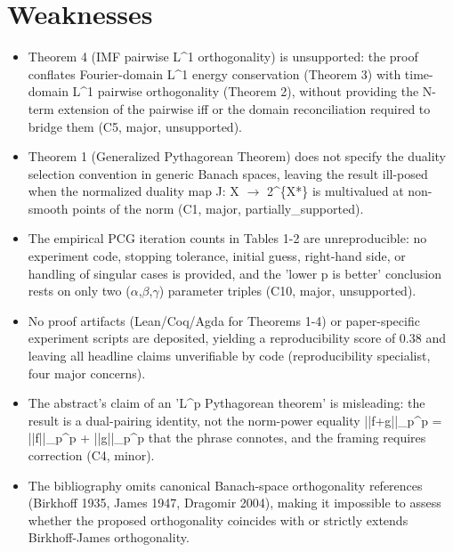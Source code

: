 \documentclass[11pt]{article}
\begin{document}
\section*{Weaknesses}
\begin{itemize}[leftmargin=*]
  \item Theorem 4 (IMF pairwise L\^{}1 orthogonality) is unsupported: the proof conflates Fourier-domain L\^{}1 energy conservation (Theorem 3) with time-domain L\^{}1 pairwise orthogonality (Theorem 2), without providing the N-term extension of the pairwise iff or the domain reconciliation required to bridge them (C5, major, unsupported).
  \item Theorem 1 (Generalized Pythagorean Theorem) does not specify the duality selection convention in generic Banach spaces, leaving the result ill-posed when the normalized duality map J: X \ensuremath{\to} 2\^{}\{X*\} is multivalued at non-smooth points of the norm (C1, major, partially\_supported).
  \item The empirical PCG iteration counts in Tables 1-2 are unreproducible: no experiment code, stopping tolerance, initial guess, right-hand side, or handling of singular cases is provided, and the 'lower p is better' conclusion rests on only two (\ensuremath{\alpha},\ensuremath{\beta},\ensuremath{\gamma}) parameter triples (C10, major, unsupported).
  \item No proof artifacts (Lean/Coq/Agda for Theorems 1-4) or paper-specific experiment scripts are deposited, yielding a reproducibility score of 0.38 and leaving all headline claims unverifiable by code (reproducibility specialist, four major concerns).
  \item The abstract's claim of an 'L\^{}p Pythagorean theorem' is misleading: the result is a dual-pairing identity, not the norm-power equality ||f+g||\_p\^{}p = ||f||\_p\^{}p + ||g||\_p\^{}p that the phrase connotes, and the framing requires correction (C4, minor).
  \item The bibliography omits canonical Banach-space orthogonality references (Birkhoff 1935, James 1947, Dragomir 2004), making it impossible to assess whether the proposed orthogonality coincides with or strictly extends Birkhoff-James orthogonality.
\end{itemize}
\end{document}
